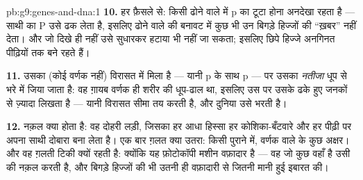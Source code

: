 \begin{solution}{pb:g9:genes-and-dna:1}
\textbf{10.} हर फ़ैसले से: किसी ढोने वाले में p का टूटा होना अनदेखा
रहता है --- साथी का P उसे ढक लेता है, इसलिए ढोने वाले की बनावट में कुछ
भी उन बिगड़े हिज्जों की ``ख़बर'' नहीं देता। और जो दिखे ही नहीं उसे सुधारकर
हटाया भी नहीं जा सकता; इसलिए छिपे हिज्जे अनगिनत पीढ़ियों तक बने रहते हैं।

\textbf{11.} उसका  (कोई वर्णक नहीं) विरासत में मिला है --- यानी p
के साथ p --- पर उसका \emph{नतीजा} धूप से भरे  में जिया जाता है:
वह ग़ायब वर्णक ही शरीर की धूप-ढाल था, इसलिए  उस पर उसके ढके हुए
जनकों से ज़्यादा लिखता है --- यानी विरासत सीमा तय करती है, और दुनिया उसे
भरती है।

\textbf{12.} नक़ल क्या होता है: वह दोहरी लड़ी, जिसका हर आधा हिस्सा हर
कोशिका-बँटवारे और हर पीढ़ी पर अपना साथी दोबारा बना लेता है। एक बार ग़लत
क्या उतरा: किसी पुराने  में, वर्णक वाले  के कुछ अक्षर। और वह
ग़लती टिकी क्यों रहती है: क्योंकि यह फ़ोटोकॉपी मशीन वफ़ादार है --- वह जो
कुछ वहाँ है उसी की नक़ल करती है, और बिगड़े हिज्जों की भी उतनी ही वफ़ादारी
से जितनी मानी हुई इबारत की।
\end{solution}
